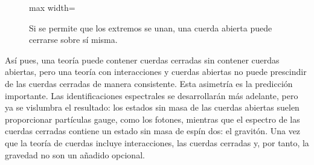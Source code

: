 \begin{figure}[H]
  \centering
  \begin{adjustbox}{max width=\linewidth}
  \end{adjustbox}
  \caption{Si se permite que los extremos se unan, una cuerda abierta puede cerrarse sobre sí misma.}
  \label{fig:l02-closed-redraw}
\end{figure}

Así pues, una teoría puede contener cuerdas cerradas sin contener cuerdas abiertas, pero una teoría con interacciones y cuerdas abiertas no puede prescindir de las cuerdas cerradas de manera consistente. Esta asimetría es la predicción importante. Las identificaciones espectrales se desarrollarán más adelante, pero ya se vislumbra el resultado: los estados sin masa de las cuerdas abiertas suelen proporcionar partículas gauge, como los fotones, mientras que el espectro de las cuerdas cerradas contiene un estado sin masa de espín dos: el gravitón. Una vez que la teoría de cuerdas incluye interacciones, las cuerdas cerradas y, por tanto, la gravedad no son un añadido opcional.

